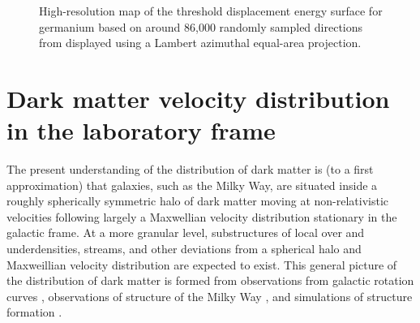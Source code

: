 \documentclass[b5paper, 10pt, twoside]{book}
\newcommand{\infernoaxiscolor}{scp-grey-light-3}
\begin{document}
\begin{figure}
    \caption{High-resolution map of the threshold displacement energy surface for germanium based on around 86,000 randomly sampled directions from \textcite{KadribasicEtAl2018} displayed using a Lambert azimuthal equal-area projection.}
    \label{fig:ge-threshold-energy}
\end{figure}

\chapter{Dark matter velocity distribution in the laboratory frame}
\label{chap:dist}

The present understanding of the distribution of dark matter is (to a first approximation) that galaxies, such as the Milky Way, are situated inside a roughly spherically symmetric halo of dark matter moving at non-relativistic velocities following largely a Maxwellian velocity distribution stationary in the galactic frame. At a more granular level, substructures of local over and underdensities, streams, and other deviations from a spherical halo and Maxweillian velocity distribution are expected to exist. This general picture of the distribution of dark matter is formed from observations from galactic rotation curves \parencites{SofueEtAl1999, LelliMcGaughSchombert2016}, observations of structure of the Milky Way \parencites{PortailEtAl2016, LabiniEtAl2023, BelokurovEtAl2018, KruijssenEtAl2018, HelmiEtAl2018}, and simulations of structure formation \parencites{VogelsbergerEtAl2014, WangEtAl2015, KlypinEtAl2016, SpringelEtAl2017, SpringelEtAl2008, DiemandEtAl2008, StadelEtAl2009, vandenBoschOgiya2018}.
\end{document}
